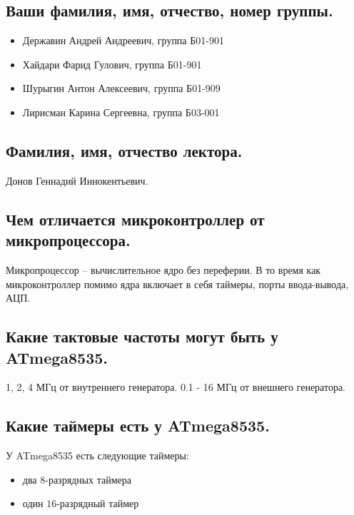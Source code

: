 \subsection{Ваши фамилия, имя, отчество, номер группы.}

\begin{itemize}
  \item \normalsize{{Державин Андрей Андреевич, группа Б01-901}}
  \item \normalsize{{Хайдари Фарид Гулович, группа Б01-901}}
  \item \normalsize{{Шурыгин Антон Алексеевич, группа Б01-909}}
  \item \normalsize{{Лирисман Карина Сергеевна, группа Б03-001}}
\end{itemize}

\subsection{Фамилия, имя, отчество лектора.} 

Донов Геннадий Иннокентьевич.

\subsection{Чем отличается микроконтроллер от микропроцессора.}

Микропроцессор -- вычислительное ядро без переферии. В то время как микроконтроллер 
помимо ядра включает в себя таймеры, порты ввода-вывода, АЦП.

\subsection{Какие тактовые частоты могут быть у ATmega8535.}
1, 2, 4 МГц от внутреннего генератора.
0.1 - 16 МГц от внешнего генератора.

\subsection{Какие таймеры есть у ATmega8535.}
У ATmega8535 есть следующие таймеры:
\begin{itemize}
  \item два $8$-разрядных таймера
  \item один $16$-разрядный таймер
\end{itemize}


